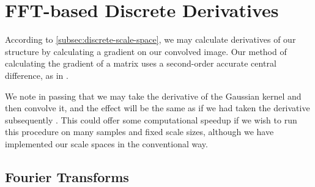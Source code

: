 \chapter{FFT-based Discrete Derivatives}

According to \cref{subsec:discrete-scale-space}, we may calculate derivatives of our structure by calculating a gradient on our convolved image. Our method of calculating the gradient of a matrix uses a second-order accurate central difference, as in \cite{fornberg-1988}.

We note in passing that we may take the derivative of the Gaussian kernel and then convolve it, and the effect will be the same as if we had taken the derivative subsequently \cite{DIPGW}. This could offer some computational speedup if we wish to run this procedure on many samples and fixed scale sizes, although we have implemented our scale spaces in the conventional way.

%
%   	
%   	


\section{Fourier Transforms}

